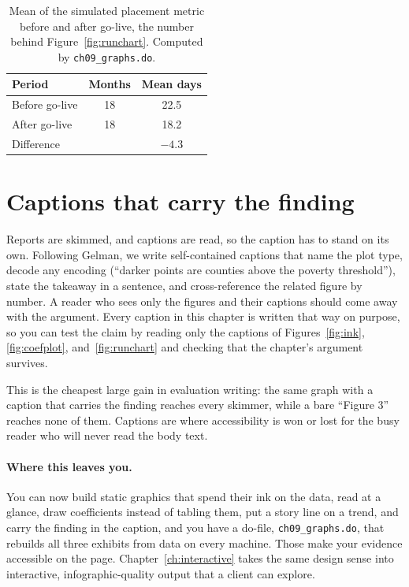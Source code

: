 \documentclass[
    a4paper,
    fontsize=10pt,
    twoside=true,
    numbers=noenddot,
]{kaobook}
\begin{document}
\begin{table}[htbp]
\centering
\caption[Before and after the intervention]{Mean of the simulated placement metric before and after go-live, the number behind Figure~\ref{fig:runchart}. Computed by \texttt{ch09\_graphs.do}.}
\label{tab:runsummary}
\begin{tabular}{lcc}
\hline
Period & Months & Mean days \\
\hline
Before go-live & 18 & 22.5 \\
After go-live  & 18 & 18.2 \\
\hline
Difference     &    & $-4.3$ \\
\hline
\end{tabular}
\end{table}

\section{Captions that carry the finding}\label{sec:captions}
Reports are skimmed, and captions are read, so the caption has to stand on its own. Following Gelman, we write self-contained captions that name the plot type, decode any encoding (\enquote{darker points are counties above the poverty threshold}), state the takeaway in a sentence, and cross-reference the related figure by number. A reader who sees only the figures and their captions should come away with the argument. Every caption in this chapter is written that way on purpose, so you can test the claim by reading only the captions of Figures~\ref{fig:ink}, \ref{fig:coefplot}, and~\ref{fig:runchart} and checking that the chapter's argument survives.

This is the cheapest large gain in evaluation writing: the same graph with a caption that carries the finding reaches every skimmer, while a bare \enquote{Figure 3} reaches none of them. Captions are where accessibility is won or lost for the busy reader who will never read the body text.

\paragraph{Where this leaves you.} You can now build static graphics that spend their ink on the data, read at a glance, draw coefficients instead of tabling them, put a story line on a trend, and carry the finding in the caption, and you have a do-file, \texttt{ch09\_graphs.do}, that rebuilds all three exhibits from data on every machine. Those make your evidence accessible on the page. Chapter~\ref{ch:interactive} takes the same design sense into interactive, infographic-quality output that a client can explore.
\end{document}
